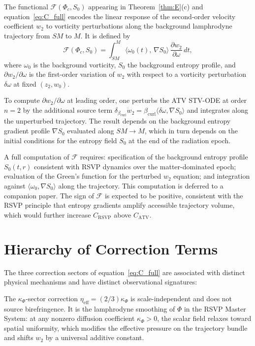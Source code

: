 \documentclass[12pt,a4paper]{article}
\theoremstyle{plain}
\theoremstyle{definition}
\theoremstyle{remark}
\newcommand{\Phic}{\Phi_c}
\newcommand{\SM}{\mathit{SM}}
\newcommand{\Mink}{\mathit{M}}
\newcommand{\etaeff}{\eta_{\mathrm{eff}}}
\newcommand{\bcurl}{\beta_{\mathrm{curl}}}
\begin{document}
The functional $\mathcal{F}(\Phic,S_0)$ appearing in Theorem~\ref{thm:E}(c) and
equation~\eqref{eq:C_full} encodes the linear response of the second-order velocity
coefficient $w_2$ to vorticity perturbations along the background lamphrodyne
trajectory from $\SM$ to $\Mink$. It is defined by
\begin{equation}
  \mathcal{F}(\Phic,S_0)
  = \int_{\SM}^{\Mink}
    \bigl\langle\omega_0(t),\,\nabla S_0\bigr\rangle\,
    \frac{\partial w_2}{\partial\omega}\,
    dt,
  \label{eq:F_functional_def}
\end{equation}
where $\omega_0$ is the background vorticity, $S_0$ the background entropy profile,
and $\partial w_2/\partial\omega$ is the first-order variation of $w_2$ with respect
to a vorticity perturbation $\delta\omega$ at fixed $(z_2,w_0)$.

To compute $\partial w_2/\partial\omega$ at leading order, one perturbs the ATV
STV-ODE at order $n=2$ by the additional source term
$\delta_{\bcurl}\dot{w}_2 = \bcurl\langle\delta\omega,\nabla S_0\rangle$ and
integrates along the unperturbed trajectory. The result depends on the background
entropy gradient profile $\nabla S_0$ evaluated along $\SM\to\Mink$, which
in turn depends on the initial conditions for the entropy field $S_0$ at the
end of the radiation epoch.

A full computation of $\mathcal{F}$ requires: specification of the background entropy
profile $S_0(t,r)$ consistent with RSVP dynamics over the matter-dominated epoch;
evaluation of the Green's function for the perturbed $w_2$ equation; and integration
against $\langle\omega_0,\nabla S_0\rangle$ along the trajectory. This computation
is deferred to a companion paper. The sign of $\mathcal{F}$ is expected to be positive,
consistent with the RSVP principle that entropy gradients amplify accessible trajectory
volume, which would further increase $C_{\mathrm{RSVP}}$ above $C_{\mathrm{ATV}}$.

\section{Hierarchy of Correction Terms}
\label{app:hierarchy}

The three correction sectors of equation~\eqref{eq:C_full} are associated with
distinct physical mechanisms and have distinct observational signatures:

The $\kappa_\Phi$-sector correction $\etaeff = (2/3)\kappa_\Phi$ is scale-independent
and does not source birefringence. It is the lamphrodyne smoothing of $\Phi$ in the
RSVP Master System: at any nonzero diffusion coefficient $\kappa_\Phi > 0$, the scalar
field relaxes toward spatial uniformity, which modifies the effective pressure on the
trajectory bundle and shifts $w_2$ by a universal additive constant.
\end{document}
